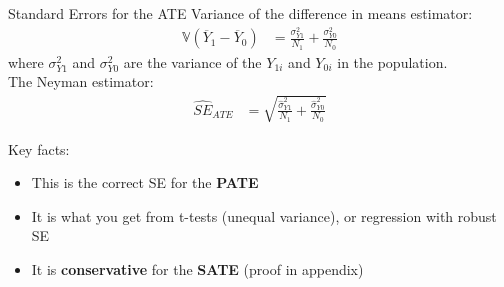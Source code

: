 \documentclass[xcolor=dvipsnames]{beamer}
\newcommand\V{\mathbb{V}}
\begin{document}
\begin{frame}{Standard Errors for the ATE}
\small
{} Variance of the difference in means estimator:
\begin{align*}
\V({\overline{Y}_1 -\overline{Y}_0}) &= \frac{\sigma^2_{Y1}}{N_1} + \frac{\sigma^2_{Y0}}{N_0}
\end{align*}
where $\sigma^2_{Y1}$ and $\sigma^2_{Y0}$ are the variance of the $Y_{1i}$ and $Y_{0i}$ in the population.\\

\medskip
{} The Neyman estimator:
\begin{align*}
\widehat{SE}_{ATE} &= \sqrt{\frac{\hat{\sigma}^2_{Y1}}{N_1} + \frac{\hat{\sigma}^2_{Y0}}{N_0}}
\end{align*}

 Key facts:
\begin{itemize}
\footnotesize
\item This is the correct SE for the \textbf{PATE}
\item It is what you get from t-tests (unequal variance), or regression with robust SE
\item It is \textbf{conservative} for the \textbf{SATE} (proof in appendix)
\end{itemize}
\end{frame}
\end{document}
